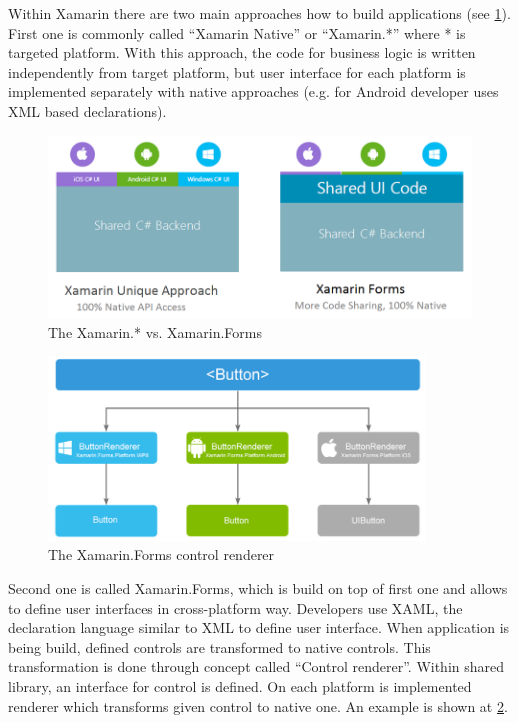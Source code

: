 Within Xamarin there are two main approaches how to build applications (see \cref{fig:xamarin-native-vs-forms}). First one is commonly called ``Xamarin Native'' or ``Xamarin.*'' where * is targeted platform. With this approach, the code for business logic is written independently from target platform, but user interface for each platform is implemented separately with native approaches (e.g. for Android developer uses XML based declarations).

\begin{figure}[ht!]
\centering
\includegraphics[width=12cm,keepaspectratio]{img/xamarin-vs-xamarin-forms}
\caption{The Xamarin.* vs. Xamarin.Forms \cite{xamarin-native-forms}}
\label{fig:xamarin-native-vs-forms}
\end{figure}

\begin{figure}[ht!]
\centering
\includegraphics[width=10cm,keepaspectratio]{img/xamarin-forms-ui-render}
\caption{The Xamarin.Forms control renderer \cite{xamarin-native-forms}}
\label{fig:xamarin-ui-renderer}
\end{figure}

Second one is called Xamarin.Forms, which is build on top of first one and allows to define user interfaces in cross-platform way. Developers use XAML, the declaration language similar to XML to define user interface. When application is being build, defined controls are transformed to native controls. This transformation is done through concept called ``Control renderer''. Within shared library, an interface for control is defined. On each platform is implemented renderer which transforms given control to native one. An example is shown at \cref{fig:xamarin-ui-renderer}.
